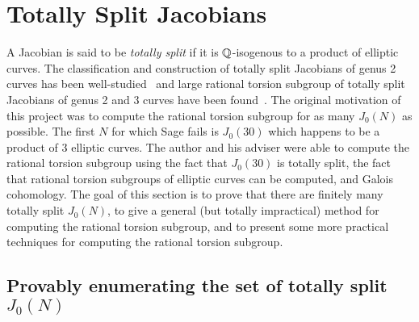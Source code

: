 \chapter{Totally Split Jacobians}%
\label{chap:totally_split}

A Jacobian is said to be \emph{totally split} if it is $\mathbb{Q}$-isogenous to a
product of elliptic curves. The classification and construction of totally
split Jacobians of genus 2 curves has been
well-studied~\cite{bruin-doerksen:split_genus_two,kuhn:split_genus_two}
and large rational torsion subgroup of totally split Jacobians of genus 2 and 3
curves have been found~\cite{howe-leprevost-poonen:large}. The original
motivation of this project was to compute the rational torsion subgroup for as
many $J_0(N)$ as possible. The first $N$ for which Sage fails is $J_0(30)$
which happens to be a product of 3 elliptic curves. The author and his adviser
were able to compute the rational torsion subgroup using the fact that
$J_0(30)$ is totally split, the fact that rational torsion subgroups of
elliptic curves can be computed, and Galois cohomology. The goal of this
section is to prove that there are finitely many totally split $J_0(N)$, to
give a general (but totally impractical) method for computing the rational
torsion subgroup, and to present some more practical techniques for computing
the rational torsion subgroup.


\section{Provably enumerating the set of totally split $J_0(N)$}

